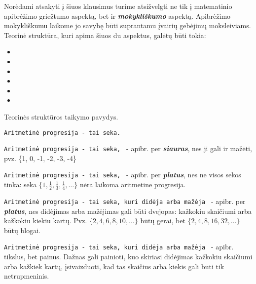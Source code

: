 \documentclass{article}
\begin{document}
Norėdami atsakyti į šiuos klausimus turime atsižvelgti ne tik į matematinio apibrėžimo griežtumo aspektą, bet ir \textbf{\textit{mokykliškumo}} aspektą. Apibrėžimo mokykliškumu laikome jo savybę būti suprantamu įvairių gebėjimų moksleiviams. Teorinė struktūra, kuri apima šiuos du aspektus, galėtų būti tokia:
\begin{itemize}
\item {} 
\item {} 
\item {} 
\item {} 
\item {}
\item {}
\end{itemize}

Teorinės struktūros taikymo pavydys.


\texttt{Aritmetinė progresija - tai seka.}


\texttt{Aritmetinė progresija - tai seka, {\color{red}{kuri didėja}}} - apibr. per \textbf{\textit{siauras}}, nes ji gali ir mažėti, pvz. \{1, 0, -1, -2, -3, -4\}

\texttt{Aritmetinė progresija - tai seka, {\color{red}{kuri didėja arba mažėja}}} - apibr. per\textbf{\textit{ platus}}, nes ne visos sekos tinka: seka $\{1, \frac{1}{2},\frac{1}{3}, \frac{1}{4}, \dots\}$ nėra laikoma aritmetine progresija.

\texttt{Aritmetinė progresija - tai seka, kuri didėja arba mažėja {\color{red}{vienodai}}} - apibr. per \textbf{\textit{platus}}, nes didėjimas arba mažėjimas gali būti dvejopas: kažkokiu skaičiumi arba kažkokiu kiekiu kartų. Pvz. $\{2, 4 ,6 ,8, 10,\dots\}$ būtų gerai, bet $\{2, 4 ,8 ,16,32,\dots\}$ būtų blogai.

\texttt{Aritmetinė progresija - tai seka, kuri didėja arba mažėja {\color{red}{kažkokiu skaičiumi}}} - apibr. tikslus, bet painus. Dažnas gali painioti, kuo skiriasi didėjimas kažkokiu skaičiumi arba kažkiek kartų, įsivaizduoti, kad tas skaičius arba kiekis gali būti tik netrupmeninis.
\end{document}
